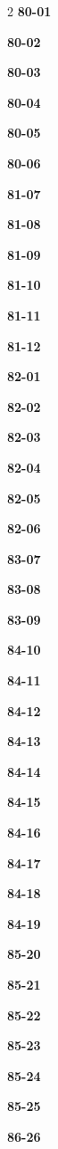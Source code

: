 \documentclass[10pt,a4paper]{article}
\begin{document}
\begin{multicols}{2}
\noindent\textbf{80-01}\ \par
\noindent\textbf{80-02}\ \par
\noindent\textbf{80-03}\ \par
\noindent\textbf{80-04}\ \par
\noindent\textbf{80-05}\ \par
\noindent\textbf{80-06}\ \par
\noindent\textbf{81-07}\ \par
\noindent\textbf{81-08}\ \par
\noindent\textbf{81-09}\ \par
\noindent\textbf{81-10}\ \par
\noindent\textbf{81-11}\ \par
\noindent\textbf{81-12}\ \par
\noindent\textbf{82-01}\ \par
\noindent\textbf{82-02}\ \par
\noindent\textbf{82-03}\ \par
\noindent\textbf{82-04}\ \par
\noindent\textbf{82-05}\ \par
\noindent\textbf{82-06}\ \par
\noindent\textbf{83-07}\ \par
\noindent\textbf{83-08}\ \par
\noindent\textbf{83-09}\ \par
\noindent\textbf{84-10}\ \par
\noindent\textbf{84-11}\ \par
\noindent\textbf{84-12}\ \par
\noindent\textbf{84-13}\ \par
\noindent\textbf{84-14}\ \par
\noindent\textbf{84-15}\ \par
\noindent\textbf{84-16}\ \par
\noindent\textbf{84-17}\ \par
\noindent\textbf{84-18}\ \par
\noindent\textbf{84-19}\ \par
\noindent\textbf{85-20}\ \par
\noindent\textbf{85-21}\ \par
\noindent\textbf{85-22}\ \par
\noindent\textbf{85-23}\ \par
\noindent\textbf{85-24}\ \par
\noindent\textbf{85-25}\ \par
\noindent\textbf{86-26}\ \par

\end{multicols}
\end{document}
